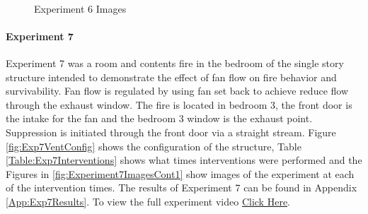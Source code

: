 \documentclass{article}
\begin{document}
\begin{figure}[H]
	\ContinuedFloat 
	\centering 
	 \ 
	\caption{Experiment 6 Images}
	\label{fig:Experiment6ImagesCont4} 
\end{figure}

\paragraph{Experiment 7}\mbox{}

Experiment 7 was a room and contents fire in the bedroom of the single story structure intended to demonstrate the effect of fan flow on fire behavior and survivability. Fan flow is regulated by using fan set back to achieve reduce flow through the exhaust window. The fire is located in bedroom 3, the front door is the intake for the fan and the bedroom 3 window is the exhaust point. Suppression is initiated through the front door via a straight stream. Figure \ref{fig:Exp7VentConfig} shows the configuration of the structure, Table \ref{Table:Exp7Interventions} shows what times interventions were performed and the Figures in \ref{fig:Experiment7ImagesCont1} show images of the experiment at each of the intervention times. The results of Experiment 7 can be found in Appendix \ref{App:Exp7Results}. To view the full experiment video \href{https://youtu.be/PmMNYFz9DYU}{Click Here}.
\end{document}
